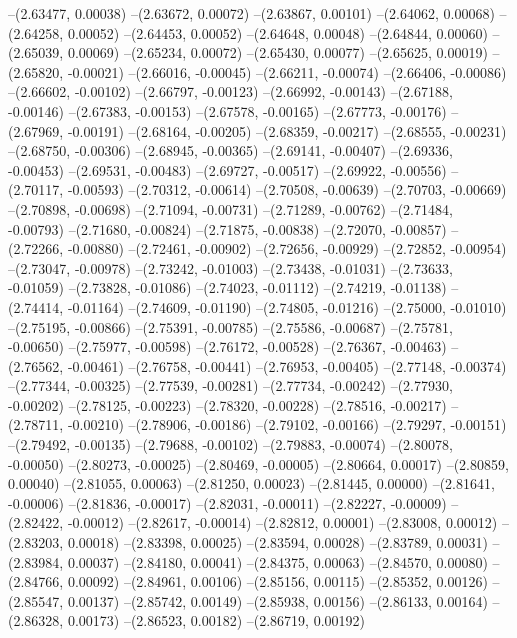 --(2.63477, 0.00038)
--(2.63672, 0.00072)
--(2.63867, 0.00101)
--(2.64062, 0.00068)
--(2.64258, 0.00052)
--(2.64453, 0.00052)
--(2.64648, 0.00048)
--(2.64844, 0.00060)
--(2.65039, 0.00069)
--(2.65234, 0.00072)
--(2.65430, 0.00077)
--(2.65625, 0.00019)
--(2.65820, -0.00021)
--(2.66016, -0.00045)
--(2.66211, -0.00074)
--(2.66406, -0.00086)
--(2.66602, -0.00102)
--(2.66797, -0.00123)
--(2.66992, -0.00143)
--(2.67188, -0.00146)
--(2.67383, -0.00153)
--(2.67578, -0.00165)
--(2.67773, -0.00176)
--(2.67969, -0.00191)
--(2.68164, -0.00205)
--(2.68359, -0.00217)
--(2.68555, -0.00231)
--(2.68750, -0.00306)
--(2.68945, -0.00365)
--(2.69141, -0.00407)
--(2.69336, -0.00453)
--(2.69531, -0.00483)
--(2.69727, -0.00517)
--(2.69922, -0.00556)
--(2.70117, -0.00593)
--(2.70312, -0.00614)
--(2.70508, -0.00639)
--(2.70703, -0.00669)
--(2.70898, -0.00698)
--(2.71094, -0.00731)
--(2.71289, -0.00762)
--(2.71484, -0.00793)
--(2.71680, -0.00824)
--(2.71875, -0.00838)
--(2.72070, -0.00857)
--(2.72266, -0.00880)
--(2.72461, -0.00902)
--(2.72656, -0.00929)
--(2.72852, -0.00954)
--(2.73047, -0.00978)
--(2.73242, -0.01003)
--(2.73438, -0.01031)
--(2.73633, -0.01059)
--(2.73828, -0.01086)
--(2.74023, -0.01112)
--(2.74219, -0.01138)
--(2.74414, -0.01164)
--(2.74609, -0.01190)
--(2.74805, -0.01216)
--(2.75000, -0.01010)
--(2.75195, -0.00866)
--(2.75391, -0.00785)
--(2.75586, -0.00687)
--(2.75781, -0.00650)
--(2.75977, -0.00598)
--(2.76172, -0.00528)
--(2.76367, -0.00463)
--(2.76562, -0.00461)
--(2.76758, -0.00441)
--(2.76953, -0.00405)
--(2.77148, -0.00374)
--(2.77344, -0.00325)
--(2.77539, -0.00281)
--(2.77734, -0.00242)
--(2.77930, -0.00202)
--(2.78125, -0.00223)
--(2.78320, -0.00228)
--(2.78516, -0.00217)
--(2.78711, -0.00210)
--(2.78906, -0.00186)
--(2.79102, -0.00166)
--(2.79297, -0.00151)
--(2.79492, -0.00135)
--(2.79688, -0.00102)
--(2.79883, -0.00074)
--(2.80078, -0.00050)
--(2.80273, -0.00025)
--(2.80469, -0.00005)
--(2.80664, 0.00017)
--(2.80859, 0.00040)
--(2.81055, 0.00063)
--(2.81250, 0.00023)
--(2.81445, 0.00000)
--(2.81641, -0.00006)
--(2.81836, -0.00017)
--(2.82031, -0.00011)
--(2.82227, -0.00009)
--(2.82422, -0.00012)
--(2.82617, -0.00014)
--(2.82812, 0.00001)
--(2.83008, 0.00012)
--(2.83203, 0.00018)
--(2.83398, 0.00025)
--(2.83594, 0.00028)
--(2.83789, 0.00031)
--(2.83984, 0.00037)
--(2.84180, 0.00041)
--(2.84375, 0.00063)
--(2.84570, 0.00080)
--(2.84766, 0.00092)
--(2.84961, 0.00106)
--(2.85156, 0.00115)
--(2.85352, 0.00126)
--(2.85547, 0.00137)
--(2.85742, 0.00149)
--(2.85938, 0.00156)
--(2.86133, 0.00164)
--(2.86328, 0.00173)
--(2.86523, 0.00182)
--(2.86719, 0.00192)
